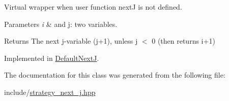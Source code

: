 \-Virtual wrapper when user function next\-J is not defined. 


\begin{DoxyParams}{\-Parameters}
{\em i} & and j\-: two variables. \\
\hline
\end{DoxyParams}
\begin{DoxyReturn}{\-Returns}
\-The next j-\/variable (j+1), unless j $<$ 0 (then returns i+1) 
\end{DoxyReturn}


\-Implemented in \hyperlink{classDefaultNextJ_af3449e182609f056189cc1a22af0dd67}{\-Default\-Next\-J}.



\-The documentation for this class was generated from the following file\-:\begin{DoxyCompactItemize}
\item 
include/\hyperlink{strategy__next__j_8hpp}{strategy\-\_\-next\-\_\-j.\-hpp}\end{DoxyCompactItemize}
